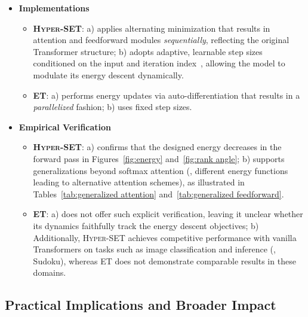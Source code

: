 \begin{itemize}[leftmargin=*]
\begin{itemize}[leftmargin=*]
            \item \textbf{\textsc{ET}}: defines energy over pre-normalized tokens (see Eq.(1)(6) in~\citet{hoover2024energy}) rather than tokens per se, bypassing the constrained optimization step. As a result, the role of normalization in \textsc{ET} is more heuristic than principled, following standard pre-norm practices rather than emerging from the underlying energy.
        \end{itemize}
    \item \textbf{Implementations}
        \begin{itemize}[leftmargin=*]
            \item \textbf{\textsc{Hyper-SET}}: a) applies alternating minimization that results in attention and feedforward modules \emph{sequentially}, reflecting the original Transformer structure; b) adopts adaptive, learnable step sizes conditioned on the input and iteration index~, allowing the model to modulate its energy descent dynamically. 
            \item \textbf{\textsc{ET}}: a) performs energy updates via auto-differentiation that results in a \emph{parallelized} fashion; b) uses fixed step sizes. 
        \end{itemize}
    \item \textbf{Empirical Verification}
        \begin{itemize}[leftmargin=*]
            \item \textbf{\textsc{Hyper-SET}}: a) confirms that the designed energy decreases in the forward pass in Figures~\ref{fig:energy} and~\ref{fig:rank angle};  b) supports generalizations beyond softmax attention (\eg, different energy functions leading to alternative attention schemes), as illustrated in Tables~\ref{tab:generalized attention} and~\ref{tab:generalized feedforward}.
            \item \textbf{\textsc{ET}}: a) does not offer such explicit verification, leaving it unclear whether its dynamics faithfully track the energy descent objectives; b) Additionally, \textsc{Hyper-SET} achieves competitive performance with vanilla Transformers on tasks such as image classification and inference (\eg, Sudoku), whereas \textsc{ET} does not demonstrate comparable results in these domains.
        \end{itemize}
\end{itemize}

\subsection{Practical Implications and Broader Impact}
\label{section:implications and impact}


